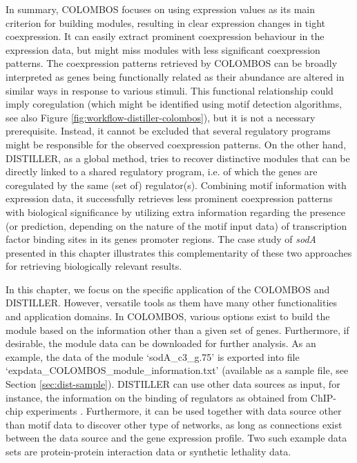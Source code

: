 In summary, COLOMBOS focuses on using expression values as its main criterion for building modules, resulting in clear expression changes in tight coexpression. It can easily extract prominent coexpression behaviour in the expression data, but might miss modules with less significant coexpression patterns. The coexpression patterns retrieved by COLOMBOS can be broadly interpreted as genes being functionally related as their abundance are altered in similar ways in response to various stimuli. This functional relationship could imply coregulation (which might be identified using motif detection algorithms, see also Figure \ref{fig:workflow-distiller-colombos}), but it is not a necessary prerequisite. Instead, it cannot be excluded that several regulatory programs might be  responsible for the observed coexpression patterns. On the other hand, DISTILLER, as a global method, tries to recover distinctive modules that can be directly linked to a shared regulatory program, i.e. of which the genes are coregulated by the same (set of) regulator(s). Combining motif information with expression data, it successfully retrieves less prominent coexpression patterns with biological significance by utilizing extra information regarding the presence (or prediction, depending on the nature of the motif input data) of transcription factor binding sites in its genes promoter regions. The case study of \textit{sodA} presented in this chapter illustrates  this complementarity of these two approaches for retrieving biologically  relevant results. 

In this chapter, we focus on the specific application of the COLOMBOS and DISTILLER.  However, versatile tools as them have many other functionalities and application domains. In COLOMBOS, various options exist to build the module based on the information other than a given set of genes.  Furthermore, if desirable, the module data can be downloaded for further analysis.  As an example, the data of the module `sodA\_c3\_g.75' is exported into file `expdata\_COLOMBOS\_module\_information.txt' (available as a sample file, see Section \ref{sec:dist-sample}). DISTILLER can use other data sources as input, for instance, the information  on the binding of regulators as obtained from ChIP-chip experiments  \cite{Lemmens2009, Lemmens2006}. Furthermore, it can be used together with data source other than motif data to  discover other type of networks, as long as connections exist between the data  source and the gene expression profile.  Two such example data sets are protein-protein interaction data or synthetic lethality data.



\cleardoublepage
 
